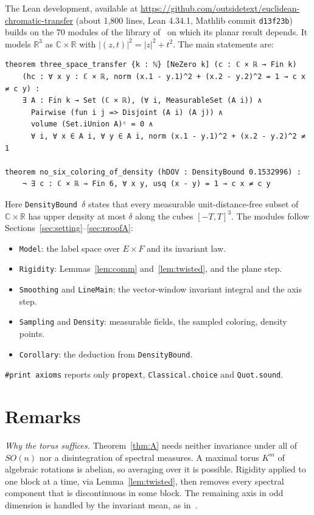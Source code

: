 \documentclass[11pt]{amsart}
\theoremstyle{definition}
\newcommand{\R}{\mathbb{R}}
\newcommand{\C}{\mathbb{C}}
\begin{document}
The Lean development, available at \url{https://github.com/outsidetext/euclidean-chromatic-transfer} (about 1{,}800 lines, Lean 4.34.1, Mathlib commit \texttt{d13f23b}) builds on the 70 modules of the library of~\cite{OAI} on which its planar result depends. It models $\R^3$ as $\C\times\R$ with $|(z,t)|^2=|z|^2+t^2$. The main statements are:

\begin{Verbatim}[formatcom=\leanfont]
theorem three_space_transfer {k : ℕ} [NeZero k] (c : ℂ × ℝ → Fin k)
    (hc : ∀ x y : ℂ × ℝ, norm (x.1 - y.1)^2 + (x.2 - y.2)^2 = 1 → c x ≠ c y) :
    ∃ A : Fin k → Set (ℂ × ℝ), (∀ i, MeasurableSet (A i)) ∧
      Pairwise (fun i j => Disjoint (A i) (A j)) ∧
      volume (Set.iUnion A)ᶜ = 0 ∧
      ∀ i, ∀ x ∈ A i, ∀ y ∈ A i, norm (x.1 - y.1)^2 + (x.2 - y.2)^2 ≠ 1

theorem no_six_coloring_of_density (hDOV : DensityBound 0.1532996) :
    ¬ ∃ c : ℂ × ℝ → Fin 6, ∀ x y, usq (x - y) = 1 → c x ≠ c y
\end{Verbatim}

Here \texttt{DensityBound}~$\delta$ states that every measurable unit-distance-free subset of $\C\times\R$ has upper density at most $\delta$ along the cubes $[-T,T]^3$. The modules follow Sections~\ref{sec:setting}--\ref{sec:proofA}:
\begin{itemize}
\item \texttt{Model}: the label space over $E\times F$ and its invariant law.
\item \texttt{Rigidity}: Lemmas~\ref{lem:comm} and~\ref{lem:twisted}, and the plane step.
\item \texttt{Smoothing} and \texttt{LineMain}: the vector-window invariant integral and the axis step.
\item \texttt{Sampling} and \texttt{Density}: measurable fields, the sampled coloring, density points.
\item \texttt{Corollary}: the deduction from \texttt{DensityBound}.
\end{itemize}
\texttt{\#print axioms} reports only \texttt{propext}, \texttt{Classical.choice} and \texttt{Quot.sound}.

\section{Remarks}

\emph{Why the torus suffices.} Theorem~\ref{thm:A} needs neither invariance under all of $SO(n)$ nor a disintegration of spectral measures. A maximal torus $K^m$ of algebraic rotations is abelian, so averaging over it is possible. Rigidity applied to one block at a time, via Lemma~\ref{lem:twisted}, then removes every spectral component that is discontinuous in some block. The remaining axis in odd dimension is handled by the invariant mean, as in~\cite[Lemma 2.5]{OAI}.
\end{document}
